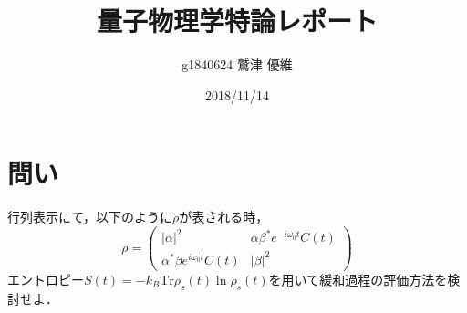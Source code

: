 \documentclass[10pt]{ujarticle}
\title{量子物理学特論レポート}
\author{g1840624 鷲津 優維}
\date{2018/11/14}
\begin{document}
\maketitle
\section{問い}
行列表示にて，以下のように$\rho$が表される時，
\[
\rho = \left(
\begin{array}{cc}
|\alpha|^2 & \alpha \beta^{\ast} e^{-i\omega_0 t} C(t) \\
\alpha^{\ast} \beta e^{i\omega_0 t} C(t) & |\beta|^2
\end{array}
\right)
\]
エントロピー$S(t) = -k_B \mathrm{Tr} \rho_s (t) \ln \rho_s(t)$を用いて緩和過程の評価方法を検討せよ．
\end{document}

